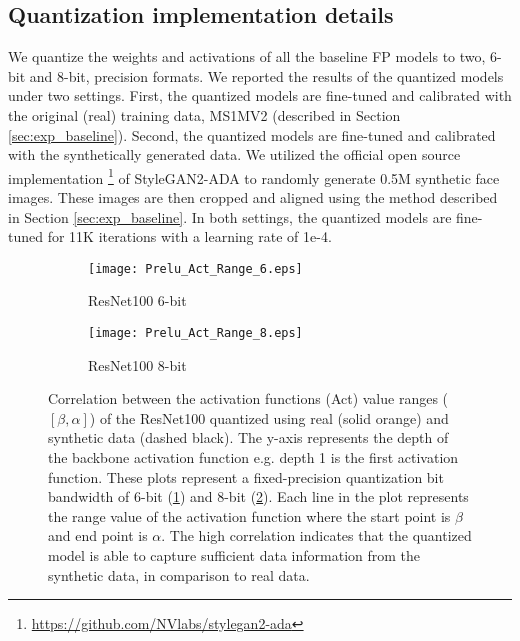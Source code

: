 \documentclass[a4paper,conference]{IEEEtran}
\begin{document}
\subsection{Quantization implementation details}
We quantize the weights and activations of all the baseline FP models to two, 6-bit and 8-bit, precision formats. 
We reported the results of the quantized models under two settings. 
First, the quantized models are fine-tuned and calibrated with the original (real) training data, MS1MV2 \cite{guo2016ms,deng2019arcface} (described in Section \ref{sec:exp_baseline}). 
Second, the quantized models are fine-tuned and calibrated with the synthetically generated data.
We utilized the official open source implementation \footnote{\url{https://github.com/NVlabs/stylegan2-ada}} of StyleGAN2-ADA to randomly generate 0.5M synthetic face images.
These images are then cropped and aligned using the method described in Section \ref{sec:exp_baseline}.
In both settings, the quantized models are fine-tuned for 11K iterations with a learning rate of 1e-4.

\begin{figure}[!t]
     \centering
     \begin{subfigure}[b]{0.40\linewidth}
         \centering
         \texttt{[image: Prelu\_Act\_Range\_6.eps]}
         \caption{ResNet100 6-bit}
         \label{fig:r100_6}
     \end{subfigure}
      \begin{subfigure}[b]{0.40\linewidth}
         \centering
         \texttt{[image: Prelu\_Act\_Range\_8.eps]}
         \caption{ResNet100 8-bit}
         \label{fig:r100_8}
     \end{subfigure}
     \vspace{-1mm}
             \caption{Correlation between the activation functions (Act) value ranges ($[\beta,\alpha]$) of the ResNet100 quantized using real (solid orange) and synthetic data (dashed black).
             The y-axis represents the depth of the backbone activation function e.g. depth 1 is the first activation function.  
             These plots represent a fixed-precision quantization bit bandwidth of 6-bit (\ref{fig:r100_6}) and 8-bit (\ref{fig:r100_8}).
             Each line in the plot represents the range value of the activation function where the start point is $\beta$ and end point is $\alpha$.
             The high correlation indicates that the quantized model is able to capture sufficient data information from the synthetic data, in comparison to real data.
             }
        \label{fig:act}
        \vspace{-4mm}
\end{figure}
\end{document}
